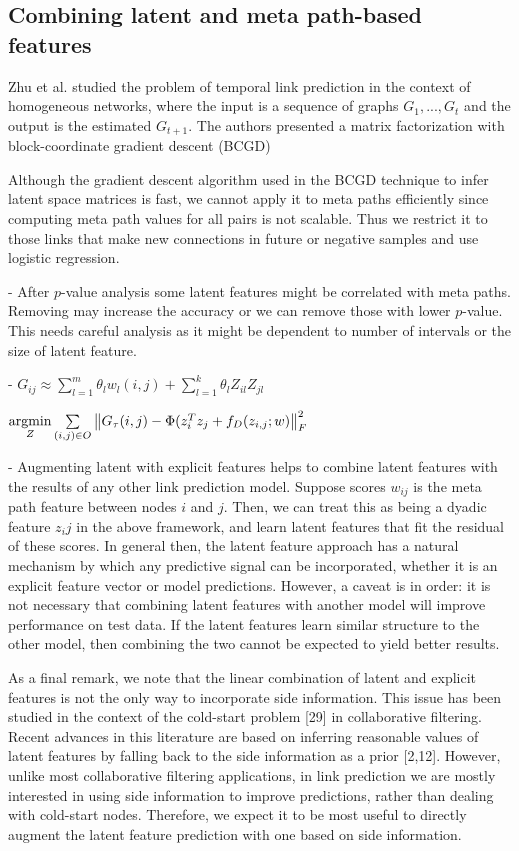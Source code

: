 \subsection{Combining latent and meta path-based features}


Zhu et al. \cite{Zhu2016} studied the problem of temporal link prediction in the context of homogeneous networks, where the input is a sequence of graphs $G_1, ..., G_t$ and the output is the estimated $G_{t+1}$. The authors presented a matrix factorization with block-coordinate gradient descent (BCGD) 


Although the gradient descent algorithm used in the BCGD technique to infer latent space matrices is fast, we cannot apply it to meta paths efficiently since computing meta path values for all pairs is not scalable. Thus we restrict it to those links that make new connections in future or negative samples and use logistic regression. 

- After $p$-value analysis some latent features might be correlated with meta paths. Removing may increase the accuracy or we can remove those with lower $p$-value. This needs careful analysis as it might be dependent to number of intervals or the size of latent feature.

- $G_{ij} \approx  \sum_{l=1}^{m} \theta_l w_l(i,j) + \sum_{l=1}^{k} \theta_l Z_{il}Z_{jl}$

$ \operatorname*{argmin}\limits_{Z} \sum\limits_{(i,j)\in O} \left \| G_\tau(i,j) - \Phi(z_{i}^Tz_{j} + f_D(z_{i,j};w) \right \|^2_F $


- Augmenting latent with explicit features helps to combine latent features with the results of any other link prediction model. Suppose scores $w_{ij}$ is the meta path feature between nodes $i$ and $j$. Then, we can treat this as being a dyadic feature $z_ij$ in the above framework, and learn latent features that fit the residual of these scores. In general then, the latent feature approach has a natural mechanism by which any predictive signal can be incorporated, whether it is an explicit feature vector or model predictions. However, a caveat is in order: it is not necessary that combining latent features with another model will improve performance on test data. If the latent features learn similar structure to the other model, then combining the two cannot be expected to yield better results.

As a final remark, we note that the linear combination of latent and explicit features is not the only way to incorporate side information. This issue has been studied in the context of the cold-start problem [29] in collaborative filtering. Recent advances in this literature are based on inferring reasonable values of latent features by falling back to the side information as a prior [2,12]. However, unlike most collaborative filtering applications, in link prediction we are mostly interested in using side information to improve predictions, rather than dealing with cold-start nodes. Therefore, we expect it to be most useful to directly augment the latent feature prediction with one based on side information.


